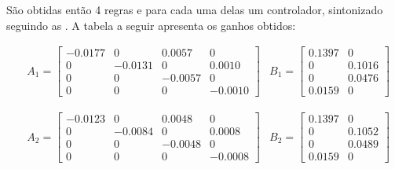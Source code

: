 \begin{table}[!ht]
	\caption{Pontos de Operação da Planta Instalada}
	\label{tabPontOp}
	\small
	\centering
\end{table}

São obtidas então 4 regras e para cada uma delas um controlador, sintonizado seguindo as . A tabela a seguir apresenta os ganhos obtidos:

\begin{align*} %
	& A_1 =
	\begin{bmatrix}
	-0.0177 &     0   &  0.0057   &      0 \\
         0  & -0.0131 &       0   &  0.0010 \\
         0  &       0 &  -0.0057  &      0 \\
         0  &       0 &        0  & -0.0010 
	\end{bmatrix}
	& B_1 =
	\begin{bmatrix}
    0.1397  &      0 \\
		0   & 0.1016 \\
		0   & 0.0476 \\
	0.0159  &      0
	\end{bmatrix}
\end{align*}

\begin{align*} %
	& A_2 =
	\begin{bmatrix}
		-0.0123 &       0 &    0.0048 &        0 \\
			0  & -0.0084 &         0 &   0.0008 \\
			0  &       0 &   -0.0048 &        0 \\
			0  &       0 &         0 &  -0.0008
	\end{bmatrix}
	& B_2 =
	\begin{bmatrix}
		0.1397 &        0 \\
			0  &  0.1052 \\
			0  &  0.0489 \\
		0.0159 &        0
	\end{bmatrix}
\end{align*}


